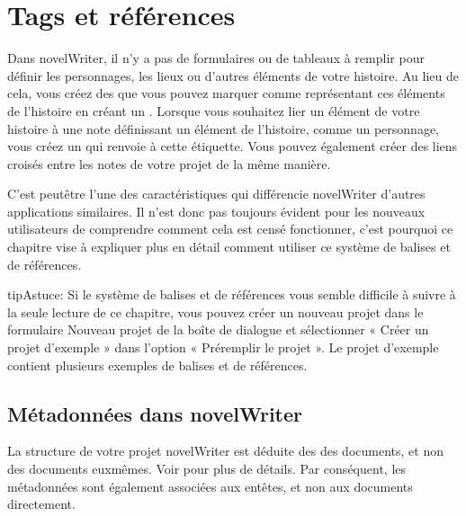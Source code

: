 \documentclass[a4paper,11pt,french]{sphinxmanual}
\begin{document}
\chapter{Tags et références}
\label{\detokenize{project_references:tags-and-references}}\label{\detokenize{project_references:a-references}}\label{\detokenize{project_references::doc}}
\sphinxAtStartPar
Dans novelWriter, il n’y a pas de formulaires ou de tableaux à remplir pour définir les personnages, les lieux ou d’autres éléments de votre histoire. Au lieu de cela, vous créez des {\hyperref[\detokenize{int_glossary:term-Project-Notes}]{}} que vous pouvez marquer comme représentant ces éléments de l’histoire en créant un {\hyperref[\detokenize{int_glossary:term-Tag}]{}}. Lorsque vous souhaitez lier un élément de votre histoire à une note définissant un élément de l’histoire, comme un personnage, vous créez un {\hyperref[\detokenize{int_glossary:term-Reference}]{}} qui renvoie à cette étiquette. Vous pouvez également créer des liens croisés entre les notes de votre projet de la même manière.

\sphinxAtStartPar
C’est peut\sphinxhyphen{}être l’une des caractéristiques qui différencie novelWriter d’autres applications similaires. Il n’est donc pas toujours évident pour les nouveaux utilisateurs de comprendre comment cela est censé fonctionner, c’est pourquoi ce chapitre vise à expliquer plus en détail comment utiliser ce système de balises et de références.

\begin{sphinxadmonition}{tip}{Astuce:}
\sphinxAtStartPar
Si le système de balises et de références vous semble difficile à suivre à la seule lecture de ce chapitre, vous pouvez créer un nouveau projet dans le formulaire Nouveau projet de la boîte de dialogue  et sélectionner « Créer un projet d’exemple » dans l’option « Pré\sphinxhyphen{}remplir le projet ». Le projet d’exemple contient plusieurs exemples de balises et de références.
\end{sphinxadmonition}


\section{Métadonnées dans novelWriter}
\label{\detokenize{project_references:metadata-in-novelwriter}}\label{\detokenize{project_references:a-references-metadata}}
\sphinxAtStartPar
La structure de votre projet novelWriter est déduite des {\hyperref[\detokenize{int_glossary:term-Headings}]{}} des documents, et non des documents eux\sphinxhyphen{}mêmes. Voir {\hyperref[\detokenize{project_structure:a-struct-heads}]{}} pour plus de détails. Par conséquent, les métadonnées sont également associées aux en\sphinxhyphen{}têtes, et non aux documents directement.
\end{document}

